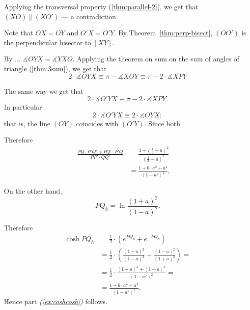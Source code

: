 Applying the transversal property (\ref{thm:parallel-2}), we get that
$(X O)\parallel (XO')$ --- a contradiction.
\qeds























Note that $OX=OY$ and $O'X=O'Y$.
By Theorem~\ref{thm:perp-bisect},
$(OO')$ is the perpendicular bisector to $[XY]$.

By ... $\measuredangle OYX=\measuredangle YXO$.
Applying the theorem on sum on the sum of angles of triangle (\ref{thm:3sum}), we get that 
\[2\cdot \measuredangle OYX\equiv\pi -\measuredangle X O Y\equiv \pi -2\cdot\measuredangle X P Y\]

The same way we get that 
\[2\cdot \measuredangle O'YX\equiv \pi -2\cdot\measuredangle X P Y.\]
In particular 
\[2\cdot \measuredangle O'YX\equiv2\cdot \measuredangle OYX;\]
that is, the line $(OY)$ coincides with $(O'Y)$.
Since both 





















Therefore
\begin{align*}
\frac{PQ\cdot  P'Q'+PQ'\cdot  P'Q}{PP'\cdot QQ'}
&=\frac{4+(\tfrac1a+a)^2}{(\tfrac1a-a)^2}=
\\
&=\frac{1+ 6\cdot a^2+a^4}{(1-a^2)^2}.
\end{align*}

On the other hand,
\[PQ_h=\ln \frac{(1+a)^2}{(1-a)^2}.\]

Therefore 
\begin{align*}\cosh PQ_h &=\tfrac12\cdot\left(e^{PQ_h}+e^{-PQ_h}\right)=
\\
&=\tfrac12\cdot\left(\frac{(1+a)^2}{(1-a)^2}+\frac{(1-a)^2}{(1+a)^2}\right)=
\\
&=\tfrac12\cdot\frac{(1+a)^4+(1-a)^4}{(1-a^2)^2}=
\\
&=\frac{1+6\cdot a^2 +a^4}{(1-a^2)^2}.
\end{align*}
Hence part \textit{(\ref{ex:coshcosh})} follows.

